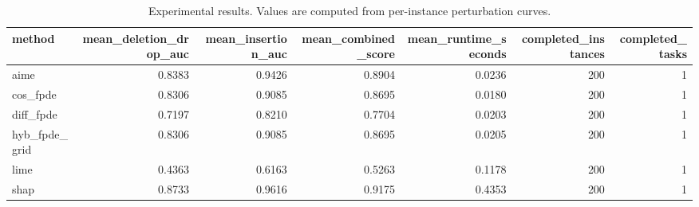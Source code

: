 \begin{table}[t]
\caption{Experimental results. Values are computed from per-instance perturbation curves.}
\label{tab:main_results_computed}
\centering
\begin{tabular}{lrrrrrr}
\toprule
method & mean\_deletion\_drop\_auc & mean\_insertion\_auc & mean\_combined\_score & mean\_runtime\_seconds & completed\_instances & completed\_tasks \\
\midrule
aime & 0.8383 & 0.9426 & 0.8904 & 0.0236 & 200 & 1 \\
cos\_fpde & 0.8306 & 0.9085 & 0.8695 & 0.0180 & 200 & 1 \\
diff\_fpde & 0.7197 & 0.8210 & 0.7704 & 0.0203 & 200 & 1 \\
hyb\_fpde\_grid & 0.8306 & 0.9085 & 0.8695 & 0.0205 & 200 & 1 \\
lime & 0.4363 & 0.6163 & 0.5263 & 0.1178 & 200 & 1 \\
shap & 0.8733 & 0.9616 & 0.9175 & 0.4353 & 200 & 1 \\
\bottomrule
\end{tabular}

\end{table}
